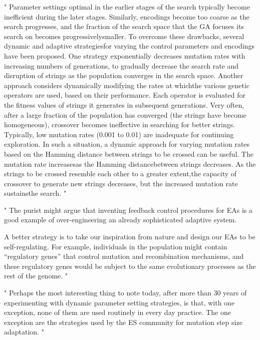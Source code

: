 "
Parameter settings optimal in the earlier stages of the search typically become inefficient during the later stages. Similarly, encodings become too coarse as the search progresses, and the fraction of the search space that the GA focuses its search on becomes progressivelysmaller. To overcome these drawbacks, several dynamic and adaptive strategiesfor varying the control parameters and encodings have been proposed. One strategy exponentially decreases mutation rates with increasing numbers of generations, to gradually decrease the search rate and disruption of strings as the population converges in the search space. Another approach considers dynamically modifying the rates at whichthe various genetic operators are used, based on their performance. Each operator is evaluated for the fitness values of strings it generates in subsequent generations. Very often, after a large fraction of the population has converged (the strings have become homogeneous), crossover becomes ineffective in searching for better strings. Typically, low mutation rates (0.001 to 0.01) are inadequate for continuing exploration. In such a situation, a dynamic approach for varying mutation rates based on the Hamming distance between strings to be crossed can be useful. The mutation rate increasesas the Hamming distancebetween strings decreases. As the strings to be crossed resemble each other to a greater extent,the capacity of crossover to generate new strings decreases, but the increased mutation rate sustainsthe search.
"\cite{srinivas_genetic_1994}

"
The purist might argue that inventing feedback control procedures for EAs is a good example of over-engineering an already sophisticated adaptive system.

A better strategy is to take our inspiration from nature and design our EAs to be self-regulating. For example, individuals in the population might contain “regulatory genes” that control mutation and recombination mechanisms, and these regulatory genes would be subject to the same evolutionary processes as the rest of the genome.
"\cite{kacprzyk_parameter_2007}



"
Perhaps the most interesting thing to note today, after more than 30 years of experimenting with dynamic parameter setting strategies, is that, with one exception, none of them are used routinely in every day practice. The one exception are the strategies used by the ES community for mutation step size adaptation.
"\cite{kacprzyk_parameter_2007}


